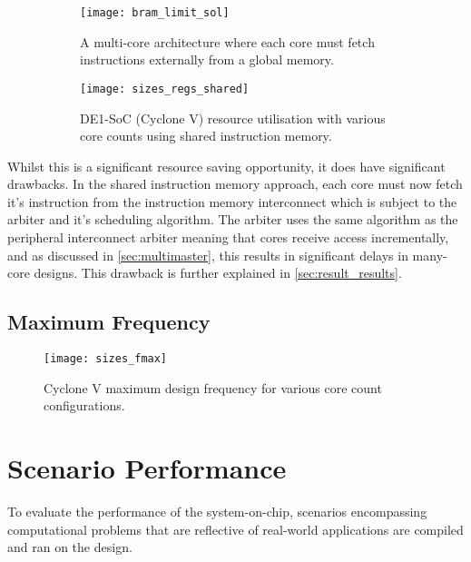 \begin{figure}[H]
\begin{subfigure}{.5\textwidth}
  \centering
  \texttt{[image: bram\_limit\_sol]}
  \caption{A multi-core architecture where each core must fetch instructions externally from a global memory.}
  \label{fig:bram_limit_sola}
\end{subfigure}%
\begin{subfigure}{.5\textwidth}
  \centering
  \texttt{[image: sizes\_regs\_shared]}
  \caption{DE1-SoC (Cyclone V) resource utilisation with various core counts using shared instruction memory.}
  \label{fig:bram_limit_solb}
\end{subfigure}
\caption{}
\label{fig:bram_limit_sol}
\end{figure}

Whilst this is a significant resource saving opportunity, it does have significant drawbacks. In the shared instruction memory approach, each core must now fetch it's instruction from the instruction memory interconnect which is subject to the arbiter and it's scheduling algorithm. The arbiter uses the same algorithm as the peripheral interconnect arbiter meaning that cores receive access incrementally, and as discussed in \cref{sec:multimaster}, this results in significant delays in many-core designs. This drawback is further explained in \cref{sec:result_results}.



\subsection{Maximum Frequency}
\begin{figure}[h]
\centering
\texttt{[image: sizes\_fmax]}
\caption{Cyclone V maximum design frequency for various core count configurations.}
\label{fig:sizes_fmax}
\end{figure}

\section{Scenario Performance}
To evaluate the performance of the system-on-chip, scenarios encompassing computational problems that are reflective of real-world applications are compiled and ran on the design.

